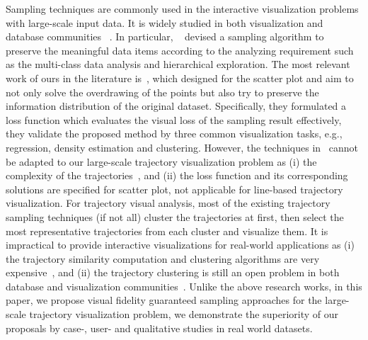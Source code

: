 Sampling techniques are commonly used in the interactive visualization problems with large-scale input data.
It is widely studied in both visualization and database communities ~\cite{battle2013dynamic,chen2014visual,park2016visualization}.
In particular, ~\cite{chen2014visual} devised a sampling algorithm to preserve the meaningful data items according to the analyzing requirement such as the multi-class data analysis and hierarchical exploration.
The most relevant work of ours in the literature is~\cite{park2016visualization}, which designed for the scatter plot and aim to not only solve the overdrawing of the points but also try to preserve the information distribution of the original dataset.
Specifically, they formulated a loss function which evaluates the visual loss of the sampling result effectively,
they validate the proposed method by three common visualization tasks, e.g., regression, density estimation and clustering.
However, the techniques in~\cite{park2016visualization} cannot be adapted to our large-scale trajectory visualization problem
as (i) the complexity of the trajectories~\cite{pelekis2010unsupervised}, and (ii) the loss function and its corresponding solutions are specified for scatter plot, not applicable for line-based trajectory visualization.
For trajectory visual analysis,  most of the existing trajectory sampling techniques (if not all) cluster the trajectories at first,
then select the most representative trajectories from each cluster and visualize them.
It is impractical to provide interactive visualizations for real-world applications as
(i) the trajectory similarity computation and clustering algorithms are very expensive~\cite{pelekis2007similarity},
and (ii) the trajectory clustering is still an open problem in both database and visualization communities~\cite{panagiotakis2011segmentation,agarwal2018subtrajectory}.
Unlike the above research works, in this paper, we propose visual fidelity guaranteed sampling approaches for the large-scale trajectory visualization problem,
we demonstrate the superiority of our proposals by case-, user- and qualitative studies in real world datasets.






